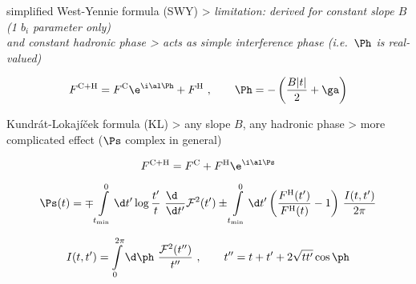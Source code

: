 \newpage %

\> {simplified West-Yennie formula} (SWY)
\>> \em{limitation}: derived for \em{constant slope $B$} (1 $b_i$ parameter only)\\ and \em{constant hadronic phase}
\>> acts as simple {interference phase} (i.e.~$\Ph$ is real-valued)

$$F^{\rm C+H} = F^{\rm C} \e^{\i \al \Ph} + F^{\rm H}\ ,\qquad \Ph = - \left( {B |t|\over 2} + \ga \right)$$

\> {Kundrát-Lokajíček formula} (KL)
\>> any slope $B$, any hadronic phase
\>> more complicated effect ($\Ps$ complex in general)

$$F^{\rm C+H} = F^{\rm C} + F^{\rm H} \e^{\i \al \Ps}$$

$$\Ps(t) =
	\mp \int\limits_{t_{\rm min}}^{0} \d t' \log {t'\over t}\ {\d\phantom{t'}\over\d t'} {\cal F}^2(t')
	\pm \int\limits_{t_{\rm min}}^{0} \d t' \left ( {F^{\rm H}(t')\over F^{\rm H}(t)} - 1 \right)\, {I(t, t')\over 2\pi}
$$

$$I(t, t') = \int\limits_{0}^{2\pi}\d\ph\ {{\cal F}^2(t'')\over t''}\ ,\qquad t'' = t + t' + 2\sqrt{t t'} \cos\ph$$



\vfil
\eject
\bye
